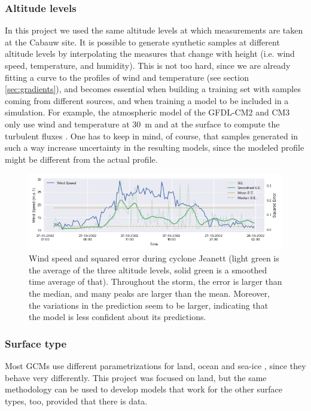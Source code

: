 \documentclass[a4paper,11pt]{kth-mag}
\begin{document}
\subsubsection{Altitude levels} In this project we used the same altitude levels at which measurements are taken at the Cabauw site. It is possible to generate synthetic samples at different altitude levels by interpolating the measures that change with height (i.e. wind speed, temperature, and humidity). This is not too hard, since we are already fitting a curve to the profiles of wind and temperature (see section \ref{sec:gradients}), and becomes essential when building a training set with samples coming from different sources, and when training a model to be included in a simulation. For example, the atmospheric model of the GFDL-CM2 and CM3 only use wind and temperature at \SI{30}{\meter} and at the surface to compute the turbulent fluxes \citep{gfdl_am2}. One has to keep in mind, of course, that samples generated in such a way increase uncertainty in the resulting models, since the modeled profile might be different from the actual profile.

\begin{figure}
    \centering
    \includegraphics[width=\textwidth]{images/jeanett_error}
    \caption{Wind speed and squared error during cyclone Jeanett (light green is the average of the three altitude levels, solid green is a smoothed time average of that). Throughout the storm, the error is larger than the median, and many peaks are larger than the mean. Moreover, the variations in the prediction seem to be larger, indicating that the model is less confident about its predictions.}
    \label{fig:jeanett_error}
\end{figure}


\subsubsection{Surface type} Most GCMs use different parametrizations for land, ocean and sea-ice \citep{gfdl_am2,gfdl_am3,hadcm3}, since they behave very differently. This project was focused on land, but the same methodology can be used to develop models that work for the other surface types, too, provided that there is data.
\end{document}
